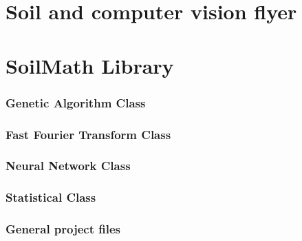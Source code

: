 \documentclass[11pt,fleqn,,a4paper,twoside,openright]{book}
\begin{document}
\chapter{Soil and computer vision flyer}


\chapter{SoilMath Library}
\subsection{Genetic Algorithm Class}


\newpage
\subsection{Fast Fourier Transform Class}


\newpage
\subsection{Neural Network Class}


\newpage
\subsection{Statistical Class}


\newpage
\subsection{General project files}








\end{document}
